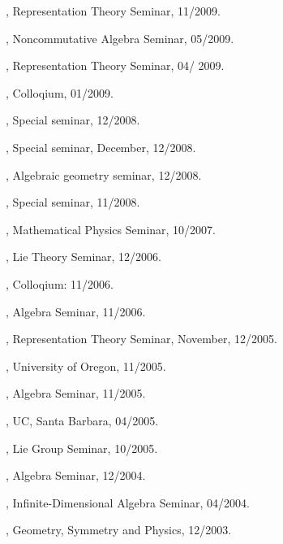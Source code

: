 \documentclass[11pt]{amsart}
\theoremstyle{plain}
\theoremstyle{definition}
\theoremstyle{remark}
\begin{document}
, Representation Theory Seminar, 11/2009.

, Noncommutative Algebra Seminar, 05/2009.

, Representation Theory Seminar, 04/ 2009.



, Colloqium, 01/2009.

, Special seminar, 12/2008.

, Special seminar, December, 12/2008.

, Algebraic geometry seminar, 12/2008.

, Special seminar, 11/2008.




, Mathematical
Physics Seminar, 10/2007.

, Lie Theory
Seminar, 12/2006.

, Colloqium:
11/2006.

, Algebra
Seminar, 11/2006.

,
Representation Theory Seminar, November, 12/2005.

, University of Oregon,
11/2005.



, Algebra Seminar,
11/2005.

, UC, Santa Barbara, 04/2005.

, Lie Group Seminar, 10/2005.

, Algebra Seminar, 12/2004.


, Infinite-Dimensional Algebra Seminar, 04/2004.

, Geometry, Symmetry and Physics,
12/2003.
\end{document}
